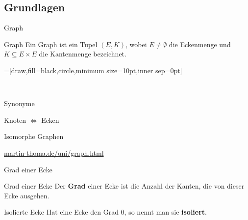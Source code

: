 \subsection{Grundlagen}
\begin{frame}{Graph}
\begin{block}{Graph}
Ein Graph ist ein Tupel $(E, K)$, wobei $E \neq \emptyset$ die Eckenmenge und 
$K \subseteq E \times E$ die 
Kantenmenge bezeichnet.
\end{block}
\pause
{}=[draw,fill=black,circle,minimum size=10pt,inner sep=0pt]

\begin{gallery}
    \\
\end{gallery}
\end{frame}

\begin{frame}{Synonyme}

\begin{center}
\Huge{Knoten $\Leftrightarrow$ Ecken}
\end{center}

\end{frame}


\begin{frame}{Isomorphe Graphen}
\begin{center}
\href{http://www.martin-thoma.de/uni/graph.html}{martin-thoma.de/uni/graph.html}
\end{center}
\end{frame}

\begin{frame}{Grad einer Ecke}
\begin{block}{Grad einer Ecke}
Der \textbf{Grad} einer Ecke ist die Anzahl der Kanten, die von dieser Ecke
ausgehen.
\end{block}

\begin{block}{Isolierte Ecke}
Hat eine Ecke den Grad 0, so nennt man sie \textbf{isoliert}.
\end{block}

\begin{gallery}
    \\
\end{gallery}
\end{frame}

